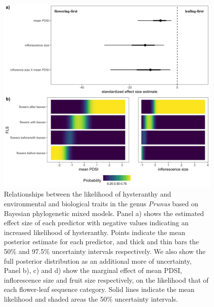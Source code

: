 \documentclass{article}[12pt]
\begin{document}
\begin{figure}[h!]
    \centering
 \includegraphics[width=\textwidth]{..//..//Plots/whatReviwerswant/fullprunus_4manu.jpeg} %
    \caption{Relationships between the likelihood of hysteranthy and environmental and biological traits in the genus \emph{Prunus} based on Bayesian phylogenetic mixed models. Panel a) shows the estimated effect size of each predictor with negative values indicating an increased likelihood of hysteranthy. Points indicate the mean posterior estimate for each predictor, and thick and thin bars the 50\% and 97.5\% uncertainty intervals respectively. We also show the full posterior distribution as an additional more of uncertainty, Panel b), c) and d) show the marginal effect of mean PDSI, inflorescence size and fruit size respectively, on the likelihood that of each flower-leaf sequence category. Solid lines indicate the mean likelihood and shaded areas the 50\% uncertainty intervals.} %
    \label{fig:genus}
\end{figure}
\end{document}
